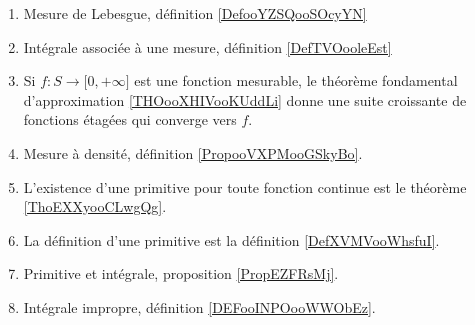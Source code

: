 
\begin{enumerate}
        \item
            Mesure de Lebesgue, définition \ref{DefooYZSQooSOcyYN}
        \item
            Intégrale associée à une mesure, définition \ref{DefTVOooleEst}
        \item
            Si \( f\colon S\to \mathopen[ 0 , +\infty \mathclose]\) est une fonction mesurable, le théorème fondamental d'approximation \ref{THOooXHIVooKUddLi} donne une suite croissante de fonctions étagées qui converge vers \( f\).
        \item
            Mesure à densité, définition \ref{PropooVXPMooGSkyBo}.
    \item
        L'existence d'une primitive pour toute fonction continue est le théorème \ref{ThoEXXyooCLwgQg}.
    \item
        La définition d'une primitive est la définition \ref{DefXVMVooWhsfuI}.
    \item
        Primitive et intégrale, proposition \ref{PropEZFRsMj}.
    \item
        Intégrale impropre, définition \ref{DEFooINPOooWWObEz}.
\end{enumerate}

